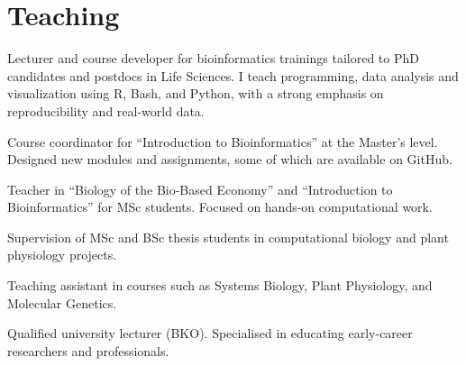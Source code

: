 \documentclass[a4paper,10pt]{article}
\begin{document}
{\begin{minipage}[t]{0.6\textwidth}
\section*{Teaching}
\begin{description}
\raggedright
\item[\normalfont \textcolor{ColorOne}{2022 -- now.}] Lecturer and course developer for bioinformatics trainings tailored to PhD candidates and postdocs in Life Sciences. I teach programming, data analysis and visualization using R, Bash, and Python, with a strong emphasis on reproducibility and real-world data.
\item[\normalfont \textcolor{ColorOne}{2020 -- 2021.}] Course coordinator for “Introduction to Bioinformatics” at the Master's level. Designed new modules and assignments, some of which are available on GitHub.
\item[\normalfont \textcolor{ColorOne}{2018 -- 2021.}] Teacher in “Biology of the Bio-Based Economy” and “Introduction to Bioinformatics” for MSc students. Focused on hands-on computational work.
\item[\normalfont \textcolor{ColorOne}{2017 -- 2022.}] Supervision of MSc and BSc thesis students in computational biology and plant physiology projects.
\item[\normalfont \textcolor{ColorOne}{2017 -- 2020.}] Teaching assistant in courses such as Systems Biology, Plant Physiology, and Molecular Genetics.
\item Qualified university lecturer (BKO). Specialised in educating early-career researchers and professionals.
\end{description}


\end{minipage}}
\end{document}
